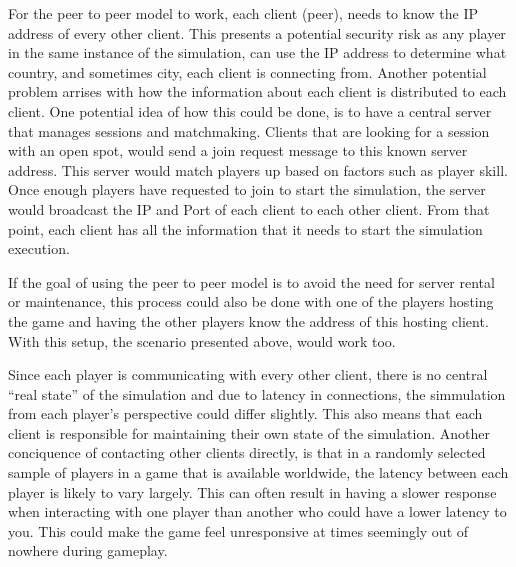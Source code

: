 For the peer to peer model to work, each client (peer), needs to know the IP address of every other client. This presents a potential security risk as any player in the same instance of the simulation, can use the IP address to determine what country, and sometimes city, each client is connecting from. Another potential problem arrises with how the information about each client is distributed to each client. One potential idea of how this could be done, is to have a central server that manages sessions and matchmaking. Clients that are looking for a session with an open spot, would send a join request message to this known server address. This server would match players up based on factors such as player skill. Once enough players have requested to join to start the simulation, the server would broadcast the IP and Port of each client to each other client. From that point, each client has all the information that it needs to start the simulation execution.

If the goal of using the peer to peer model is to avoid the need for server rental or maintenance, this process could also be done with one of the players hosting the game and having the other players know the address of this hosting client. With this setup, the scenario presented above, would work too.

Since each player is communicating with every other client, there is no central ``real state'' of the simulation and due to latency in connections, the simmulation from each player's perspective could differ slightly. This also means that each client is responsible for maintaining their own state of the simulation. Another conciquence of contacting other clients directly, is that in a randomly selected sample of players in a game that is available worldwide, the latency between each player is likely to vary largely. This can often result in having a slower response when interacting with one player than another who could have a lower latency to you. This could make the game feel unresponsive at times seemingly out of nowhere during gameplay.


